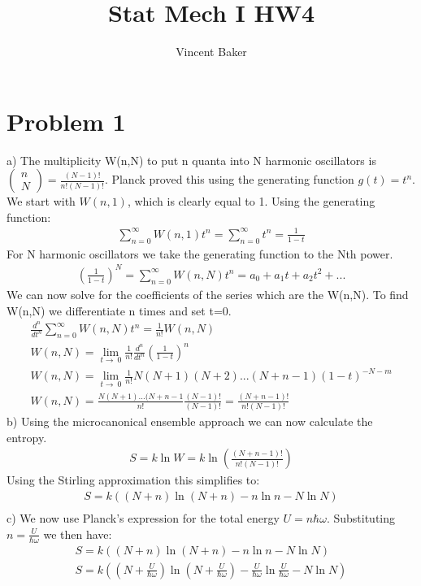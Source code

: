 \documentclass[a4paper,11pt]{article}
\title{Stat Mech I HW4}
\author{Vincent Baker}
\numberwithin{equation}{section}
\begin{document}
\maketitle

\section{Problem 1}
a) The multiplicity W(n,N) to put n quanta into N harmonic oscillators is $\left(\begin{smallmatrix}n\\N \end{smallmatrix}\right)=\frac{(N-1)!}{n!(N-1)!}$.
Planck proved this using the generating function $g(t)=t^n$. 
We start with $W(n,1)$, which is clearly equal to 1. Using the generating function:
\begin{gather}
 \sum_{n=0}^{\infty}W(n,1)t^n=\sum_{n=0}^{\infty}t^n=\frac{1}{1-t}
\end{gather}
For N harmonic oscillators we take the generating function to the Nth power.
\begin{gather}
 \left(\frac{1}{1-t}\right)^N=\sum_{n=0}^{\infty}W(n,N)t^n=a_0+a_1t+a_2t^2+...
\end{gather}
We can now solve for the coefficients of the series which are the W(n,N).
To find W(n,N) we differentiate n times and set t=0.
\begin{gather}
 \frac{d^n}{dt^n}\sum_{n=0}^{\infty}W(n,N)t^n=\frac{1}{n!}W(n,N)\\
 W(n,N) = \lim_{t\to\ 0}\frac{1}{n!}\frac{d^n}{dt^n}\left(\frac{1}{1-t}\right)^n\\
 W(n,N)=\lim_{t\to\ 0}\frac{1}{n!}N(N+1)(N+2)...(N+n-1)(1-t)^{-N-m}\\
 W(n,N)=\frac{N(N+1)...(N+n-1}{n!}\frac{(N-1)!}{(N-1)!}=\frac{(N+n-1)!}{n!(N-1)!}
\end{gather}
b) Using the microcanonical ensemble approach we can now calculate the entropy.
\begin{gather}
 S=k\ln{W}=k\ln{\left(\frac{(N+n-1)!}{n!(N-1)!}\right)}
\end{gather}
Using the Stirling approximation this simplifies to:
\begin{gather}
 S=k((N+n)\ln{(N+n)}-n\ln{n}-N\ln{N} )\\
\end{gather}
c) We now use Planck's expression for the total energy $U=n\hbar \omega$.
Substituting $n=\frac{U}{\hbar \omega}$ we then have:
\begin{gather}
 S=k((N+n)\ln{(N+n)}-n\ln{n}-N\ln{N} )\\
 S=k((N+\frac{U}{\hbar \omega})\ln{(N+\frac{U}{\hbar \omega})}-\frac{U}{\hbar \omega}\ln{\frac{U}{\hbar \omega}}-N\ln{N} )
\end{gather}
\end{document}
